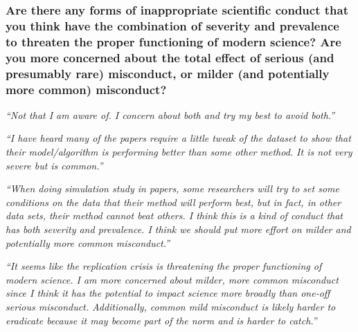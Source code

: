 \documentclass[12pt]{beamer}
\newcommand\ans[1]{{\it ``#1''}}
\begin{document}
\begin{frame}   %

  \frametitle{ 
 Are there any forms of inappropriate scientific conduct that you think have the combination of severity and prevalence to threaten the proper functioning of modern science? Are you more concerned about the total effect of serious (and presumably rare) misconduct, or milder (and potentially more common) misconduct?
}


\ans{Not that I am aware of.  I concern about both and try my best to avoid both.}

\ans{I have heard many of the papers require a little tweak of the dataset to show that their model/algorithm is performing better than some other method.  It is not very severe but is common.}

\end{frame}

\begin{frame}

\ans{When doing simulation study in papers, some researchers will try to set some conditions on the data that their method will perform best, but in fact, in other data sets, their method cannot beat others.  I think this is a kind of conduct that has both severity and prevalence.  I think we should put more effort on milder and potentially more common misconduct.}

\end{frame}

\begin{frame}
\ans{It  seems  like  the  replication  crisis  is  threatening  the  proper  functioning  of  modern science.  I am more concerned about milder, more common misconduct since I think it has the potential to impact science more broadly than one-off serious misconduct. Additionally,  common  mild  misconduct  is  likely  harder  to  eradicate  because  it  may become part of the norm and is harder to catch.}
\end{frame}
\end{document}
